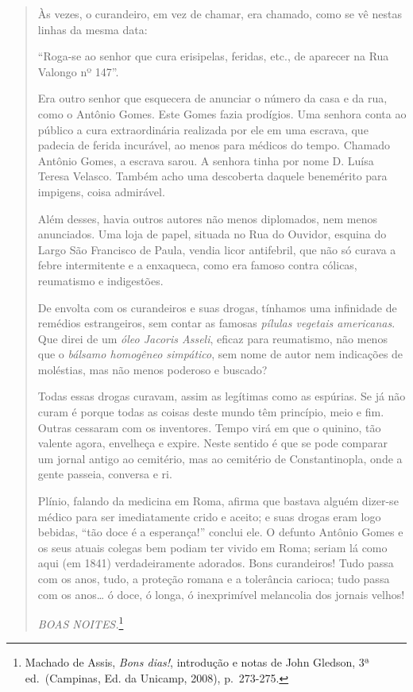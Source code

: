 \begin{quote}
Às vezes, o curandeiro, em vez de chamar, era chamado, como se vê nestas
linhas da mesma data:

``Roga-se ao senhor que cura erisipelas, feridas, etc., de aparecer na
Rua Valongo nº 147''.

Era outro senhor que esquecera de anunciar o número da casa e da rua,
como o Antônio Gomes. Este Gomes fazia prodígios. Uma senhora conta ao
público a cura extraordinária realizada por ele em uma escrava, que
padecia de ferida incurável, ao menos para médicos do tempo. Chamado
Antônio Gomes, a escrava sarou. A senhora tinha por nome D. Luísa Teresa
Velasco. Também acho uma descoberta daquele benemérito para impigens,
coisa admirável.

Além desses, havia outros autores não menos diplomados, nem menos
anunciados. Uma loja de papel, situada no Rua do Ouvidor, esquina do
Largo São Francisco de Paula, vendia licor antifebril, que não só curava
a febre intermitente e a enxaqueca, como era famoso contra cólicas,
reumatismo e indigestões.

De envolta com os curandeiros e suas drogas, tínhamos uma infinidade de
remédios estrangeiros, sem contar as famosas \textit{pílulas vegetais
americanas}. Que direi de um \textit{óleo Jacoris Asseli}, eficaz para
reumatismo, não menos que o \textit{bálsamo homogêneo simpático}, sem nome
de autor nem indicações de moléstias, mas não menos poderoso e buscado?

Todas essas drogas curavam, assim as legítimas como as espúrias. Se já
não curam é porque todas as coisas deste mundo têm princípio, meio e
fim. Outras cessaram com os inventores. Tempo virá em que o quinino, tão
valente agora, envelheça e expire. Neste sentido é que se pode comparar
um jornal antigo ao cemitério, mas ao cemitério de Constantinopla, onde
a gente passeia, conversa e ri.

Plínio, falando da medicina em Roma, afirma que bastava alguém dizer-se
médico para ser imediatamente crido e aceito; e suas drogas eram logo
bebidas, ``tão doce é a esperança!'' conclui ele. O defunto Antônio
Gomes e os seus atuais colegas bem podiam ter vivido em Roma; seriam lá
como aqui (em 1841) verdadeiramente adorados. Bons curandeiros! Tudo
passa com os anos, tudo, a proteção romana e a tolerância carioca; tudo
passa com os anos\dots{} ó doce, ó longa, ó inexprimível melancolia dos
jornais velhos!

\textit{BOAS NOITES.}\footnote{Machado de Assis, \textit{Bons dias!},
  introdução e notas de John Gledson, 3ª ed.~(Campinas, Ed. da Unicamp,
  2008), p.~273-275.}
\end{quote}

